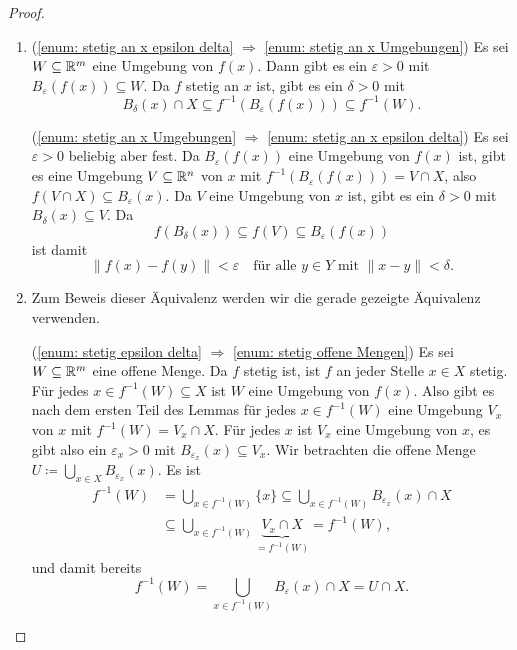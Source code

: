 \documentclass[a4paper,10pt]{article}
\begin{document}
\begin{proof}
 \begin{enumerate}
  \item
   (\ref{enum: stetig an x epsilon delta} $\Rightarrow$ \ref{enum: stetig an x Umgebungen}) Es sei $W \subseteq \mathbb{R}^m$ eine Umgebung von $f(x)$. Dann gibt es ein $\varepsilon > 0$ mit $B_\varepsilon(f(x)) \subseteq W$. Da $f$ stetig an $x$ ist, gibt es ein $\delta > 0$ mit
   \[
    B_\delta(x) \cap X \subseteq f^{-1}(B_\varepsilon(f(x))) \subseteq f^{-1}(W).
   \]
   
   (\ref{enum: stetig an x Umgebungen} $\Rightarrow$ \ref{enum: stetig an x epsilon delta}) Es sei $\varepsilon > 0$ beliebig aber fest. Da $B_\varepsilon(f(x))$ eine Umgebung von $f(x)$ ist, gibt es eine Umgebung $V \subseteq \mathbb{R}^n$ von $x$ mit $f^{-1}(B_\varepsilon(f(x))) = V \cap X$, also $f(V \cap X) \subseteq B_\varepsilon(x)$. Da $V$ eine Umgebung von $x$ ist, gibt es ein $\delta > 0$ mit $B_\delta(x) \subseteq V$. Da
   \[
    f(B_\delta(x)) \subseteq f(V) \subseteq B_\varepsilon(f(x))
   \]
   ist damit
   \[
    \|f(x)-f(y)\| < \varepsilon \quad \text{für alle $y \in Y$ mit $\|x-y\| < \delta$}.
   \]
  \item
   Zum Beweis dieser Äquivalenz werden wir die gerade gezeigte Äquivalenz verwenden.
   
   (\ref{enum: stetig epsilon delta} $\Rightarrow$ \ref{enum: stetig offene Mengen}) Es sei $W \subseteq \mathbb{R}^m$ eine offene Menge. Da $f$ stetig ist, ist $f$ an jeder Stelle $x \in X$ stetig. Für jedes $x \in f^{-1}(W) \subseteq X$ ist $W$ eine Umgebung von $f(x)$. Also gibt es nach dem ersten Teil des Lemmas für jedes $x \in f^{-1}(W)$ eine Umgebung $V_x$ von $x$ mit $f^{-1}(W) = V_x \cap X$. Für jedes $x$ ist $V_x$ eine Umgebung von $x$, es gibt also ein $\varepsilon_x > 0$ mit $B_{\varepsilon_x}(x) \subseteq V_x$. Wir betrachten die offene Menge $U \coloneqq \bigcup_{x \in X} B_{\varepsilon_x}(x)$. Es ist
   \begin{align*}
    f^{-1}(W)
    &= \bigcup_{x \in f^{-1}(W)} \{x\}
    \subseteq \bigcup_{x \in f^{-1}(W)} B_{\varepsilon_x}(x) \cap X \\
    &\subseteq \bigcup_{x \in f^{-1}(W)} \underbrace{V_x \cap X}_{= f^{-1}(W)}
    = f^{-1}(W),
   \end{align*}
   und damit bereits
   \[
    f^{-1}(W)
    = \bigcup_{x \in f^{-1}(W)} B_\varepsilon(x) \cap X
    =  U \cap X.
   \]
   

\end{enumerate}
\end{proof}
\end{document}
